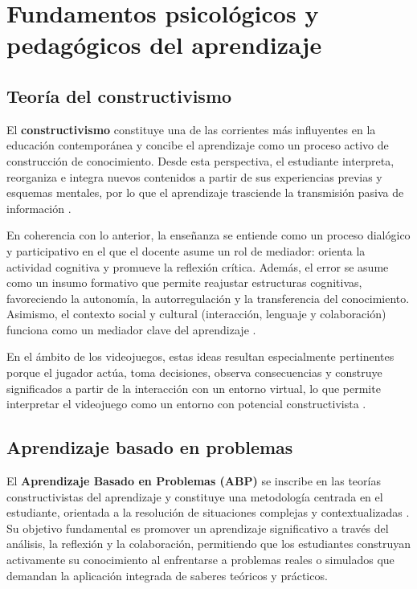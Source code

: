 \section{Fundamentos psicológicos y pedagógicos del aprendizaje}

\subsection{Teoría del constructivismo}

El \textbf{constructivismo} constituye una de las corrientes más influyentes en la educación contemporánea y concibe el aprendizaje como un proceso activo de construcción de conocimiento. Desde esta perspectiva, el estudiante interpreta, reorganiza e integra nuevos contenidos a partir de sus experiencias previas y esquemas mentales, por lo que el aprendizaje trasciende la transmisión pasiva de información \cite{tigse_parreno_constructivismo_2019,ortiz_granja_constructivismo_2015}.

En coherencia con lo anterior, la enseñanza se entiende como un proceso dialógico y participativo en el que el docente asume un rol de mediador: orienta la actividad cognitiva y promueve la reflexión crítica. Además, el error se asume como un insumo formativo que permite reajustar estructuras cognitivas, favoreciendo la autonomía, la autorregulación y la transferencia del conocimiento. Asimismo, el contexto social y cultural (interacción, lenguaje y colaboración) funciona como un mediador clave del aprendizaje \cite{ortiz_granja_constructivismo_2015}.

En el ámbito de los videojuegos, estas ideas resultan especialmente pertinentes porque el jugador actúa, toma decisiones, observa consecuencias y construye significados a partir de la interacción con un entorno virtual, lo que permite interpretar el videojuego como un entorno con potencial constructivista \cite{lukic_konstruktivizam_nodate}.

\subsection{Aprendizaje basado en problemas}

El \textbf{Aprendizaje Basado en Problemas (ABP)} se inscribe en las teorías constructivistas del aprendizaje y constituye una metodología centrada en el estudiante, orientada a la resolución de situaciones complejas y contextualizadas \cite{ruiz-meza_application_nodate}.
Su objetivo fundamental es promover un aprendizaje significativo a través del análisis, la reflexión y la colaboración, permitiendo que los estudiantes construyan activamente su conocimiento al enfrentarse a problemas reales o simulados que demandan la aplicación integrada de saberes teóricos y prácticos.

